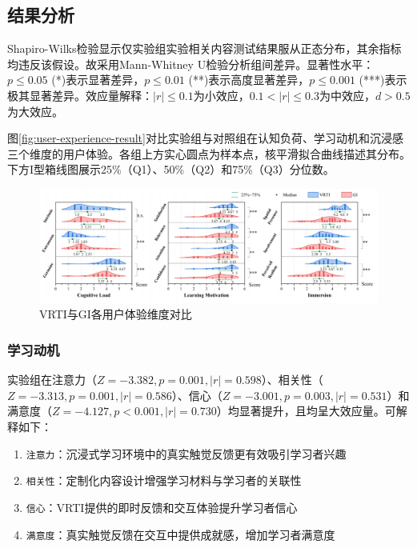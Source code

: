 \documentclass[runningheads]{llncs}
\begin{document}
\subsection{结果分析}

Shapiro-Wilks检验显示仅实验组实验相关内容测试结果服从正态分布，其余指标均违反该假设。故采用Mann-Whitney U检验分析组间差异。显著性水平：$p \le 0.05$ (*)表示显著差异，$p \le 0.01$ (**)表示高度显著差异，$p \le 0.001$ (***)表示极其显著差异。效应量解释：$|r| \le 0.1$为小效应，$0.1 < |r| \le  0.3$为中效应，$d > 0.5$为大效应。

图\ref{fig:user-experience-result}对比实验组与对照组在认知负荷、学习动机和沉浸感三个维度的用户体验。各组上方实心圆点为样本点，核平滑拟合曲线描述其分布。下方I型箱线图展示25\%（Q1）、50\%（Q2）和75\%（Q3）分位数。

\begin{figure}[t]
  \centering
  \includegraphics[width=\textwidth]{image/three-user-experience-result.pdf}
  \caption{VRTI与GI各用户体验维度对比}
  \label{fig:three-user-experience-result}
\end{figure}

\subsubsection{学习动机}
实验组在注意力（$Z=-3.382, p=0.001, |r|=0.598$）、相关性（$Z=-3.313, p=0.001, |r|=0.586$）、信心（$Z=-3.001, p=0.003, |r|=0.531$）和满意度（$Z=-4.127, p<0.001, |r|=0.730$）均显著提升，且均呈大效应量。可解释如下：
\begin{enumerate}
  \item {\texttt{注意力}}：沉浸式学习环境中的真实触觉反馈更有效吸引学习者兴趣
  \item {\texttt{相关性}}：定制化内容设计增强学习材料与学习者的关联性
  \item {\texttt{信心}}：VRTI提供的即时反馈和交互体验提升学习者信心
  \item {\texttt{满意度}}：真实触觉反馈在交互中提供成就感，增加学习者满意度
\end{enumerate}
\end{document}
